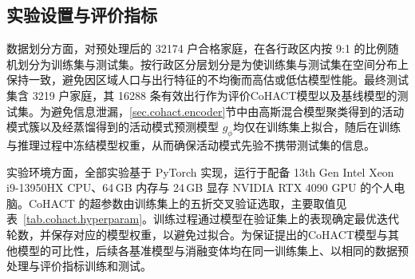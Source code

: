 \subsection{实验设置与评价指标}\label{subsec.cohact.experiment.setting}

数据划分方面，对预处理后的 32174 户合格家庭，在各行政区内按 9:1 的比例随机划分为训练集与测试集。按行政区分层划分是为使训练集与测试集在空间分布上保持一致，避免因区域人口与出行特征的不均衡而高估或低估模型性能。最终测试集含 3219 户家庭，其 16288 条有效出行作为评价CoHACT模型以及基线模型的测试集。为避免信息泄漏，\ref{sec.cohact.encoder}节中由高斯混合模型聚类得到的活动模式簇以及经蒸馏得到的活动模式预测模型 $g_\phi$均仅在训练集上拟合，随后在训练与推理过程中冻结模型权重，从而确保活动模式先验不携带测试集的信息。

实验环境方面，全部实验基于 PyTorch 实现，运行于配备 13th Gen Intel Xeon i9-13950HX CPU、64\,GB 内存与 24\,GB 显存 NVIDIA RTX 4090 GPU 的个人电脑。CoHACT 的超参数由训练集上的五折交叉验证选取，主要取值见表~\ref{tab.cohact.hyperparam}。训练过程通过模型在验证集上的表现确定最优迭代轮数，并保存对应的模型权重，以避免过拟合。为保证提出的CoHACT模型与其他模型的可比性，后续各基准模型与消融变体均在同一训练集上、以相同的数据预处理与评价指标训练和测试。

